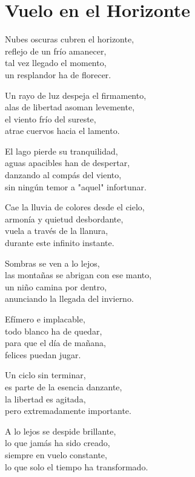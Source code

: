 \section*{Vuelo en el Horizonte}
\label{Vuelo_en_el_hor}

\vspace{1em}
\begin{center}
Nubes oscuras cubren el horizonte,\\
reflejo de un frío amanecer,\\
tal vez llegado el momento,\\
un resplandor ha de florecer.

\vspace{1em}
Un rayo de luz despeja el firmamento,\\
alas de libertad asoman levemente,\\
el viento frío del sureste,\\
atrae cuervos hacia el lamento.

\vspace{1em}
El lago pierde su tranquilidad,\\
aguas apacibles han de despertar,\\
danzando al compás del viento,\\
sin ningún temor a "aquel" infortunar.

\vspace{1em}
Cae la lluvia de colores desde el cielo,\\
armonía y quietud desbordante,\\
vuela a través de la llanura,\\
durante este infinito instante.

\vspace{1em}
Sombras se ven a lo lejos,\\
las montañas se abrigan con ese manto,\\
un niño camina por dentro,\\
anunciando la llegada del invierno.

\vspace{1em}
Efímero e implacable,\\
todo blanco ha de quedar,\\
para que el día de mañana,\\
felices puedan jugar.

\vspace{1em}
Un ciclo sin terminar,\\
es parte de la esencia danzante,\\
la libertad es agitada,\\
pero extremadamente importante.

\vspace{1em}
A lo lejos se despide brillante,\\
lo que jamás ha sido creado,\\
siempre en vuelo constante,\\
lo que solo el tiempo ha transformado.


\end{center}




